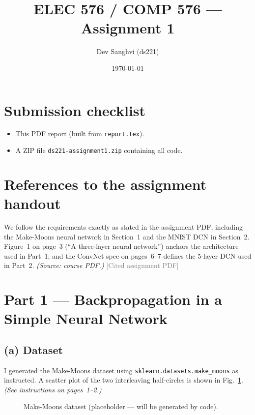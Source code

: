 \documentclass[11pt]{article}
\title{ELEC 576 / COMP 576 --- Assignment 1\\\large }
\author{Dev Sanghvi (ds221)}
\date{\today}
\begin{document}
\maketitle

\section*{Submission checklist}
\begin{itemize}[leftmargin=1.2em]
  \item This PDF report (built from \texttt{report.tex}).
  \item A ZIP file \texttt{ds221-assignment1.zip} containing all code.
\end{itemize}

\section{References to the assignment handout}
We follow the requirements exactly as stated in the assignment PDF, including the Make-Moons neural network in Section~1 and the MNIST DCN in Section~2. Figure~1 on page~3 (``A three-layer neural network'') anchors the architecture used in Part~1; and the ConvNet spec on pages~6--7 defines the 5-layer DCN used in Part~2. \textit{(Source: course PDF.)} \textcolor{gray}{[Cited assignment PDF]}

\section{Part 1 --- Backpropagation in a Simple Neural Network}
\subsection{(a) Dataset}
I generated the Make-Moons dataset using \texttt{sklearn.datasets.make\_moons} as instructed. A scatter plot of the two interleaving half-circles is shown in Fig.~\ref{fig:moons-scatter}. \textit{(See instructions on pages~1--2.)}

\begin{figure}[h]
  \centering
  \caption{Make-Moons dataset (placeholder --- will be generated by code).}
  \label{fig:moons-scatter}
\end{figure}
\end{document}
